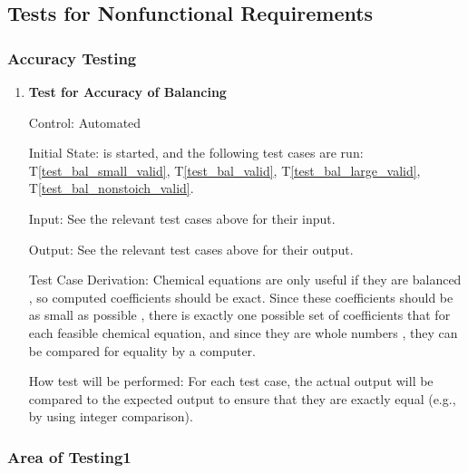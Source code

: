 \documentclass[12pt, titlepage]{article}
\newcounter{testnum} %
\newcommand{\testref}[1]{T\ref{#1}}
\begin{document}
\subsection{Tests for Nonfunctional Requirements}

\subsubsection{Accuracy Testing}

\begin{enumerate}

  \item[T\refstepcounter{testnum}\thetestnum \label{test_bal_accuracy}:]
    \textbf{Test for Accuracy of Balancing}

    Control: Automated

    Initial State: \progname{} is started, and the following test cases are
    run: \testref{test_bal_small_valid}, \testref{test_bal_valid},
    \testref{test_bal_large_valid}, \testref{test_bal_nonstoich_valid}.

    Input: See the relevant test cases above for their input.

    Output: See the relevant test cases above for their output.

    Test Case Derivation: Chemical equations are only useful if they are
    balanced \cite{lund_introduction_2023}, so computed coefficients should be
    exact. Since these coefficients should be as small as possible
    \cite{lund_introduction_2023}, there is exactly one possible set of
    coefficients that for each feasible chemical equation, and since they are
    whole numbers \cite{lund_introduction_2023}, they can be compared for
    equality by a computer.

    How test will be performed: For each test case, the actual output will be
    compared to the expected output to ensure that they are exactly equal
    (e.g., by using integer comparison).

\end{enumerate}



\subsubsection{Area of Testing1}
\end{document}
